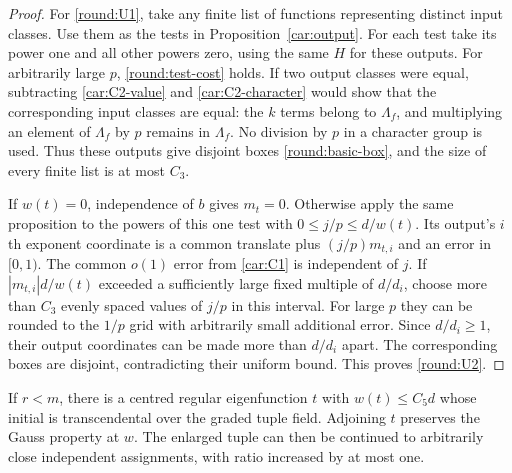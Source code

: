 \begin{proof}
For \eqref{round:U1}, take any finite list of functions representing
distinct input classes. Use them as the tests in
Proposition~\ref{car:output}. For each test take its power one and
all other powers zero, using the same $H$ for these outputs.
For arbitrarily large $p$, \eqref{round:test-cost} holds. If two
output classes were equal, subtracting
\eqref{car:C2-value} and \eqref{car:C2-character} would show that
the corresponding input classes are equal: the $k$ terms belong
to $\Lambda_f$, and multiplying an element of $\Lambda_f$ by
$p$ remains in $\Lambda_f$. No division by $p$ in a character
group is used. Thus these outputs give disjoint boxes
\eqref{round:basic-box}, and the size of every finite list is
at most $C_3$.

If $w(t)=0$, independence of $b$ gives $m_t=0$. Otherwise apply
the same proposition to the powers of this one test with
$0\le j/p\le d/w(t)$. Its output's $i$th exponent coordinate
is a common translate plus $(j/p)m_{t,i}$ and an error in
$[0,1)$. The common $o(1)$ error from \eqref{car:C1} is independent
of $j$. If $|m_{t,i}|d/w(t)$ exceeded a sufficiently large fixed
multiple of $d/d_i$, choose more than $C_3$ evenly spaced
values of $j/p$ in this interval. For large $p$ they can be
rounded to the $1/p$ grid with arbitrarily small additional error.
Since $d/d_i\ge1$, their output coordinates can be made more
than $d/d_i$ apart. The corresponding boxes are disjoint,
contradicting their uniform bound. This proves \eqref{round:U2}.
\end{proof}

\begin{lemma}\label{round:enlarge}
If $r<m$, there is a centred regular eigenfunction $t$ with
$w(t)\le C_5d$ whose initial is transcendental over the graded
tuple field. Adjoining $t$ preserves the Gauss property at $w$.
The enlarged tuple can then be continued to arbitrarily close
independent assignments, with ratio increased by at most one.
\end{lemma}

